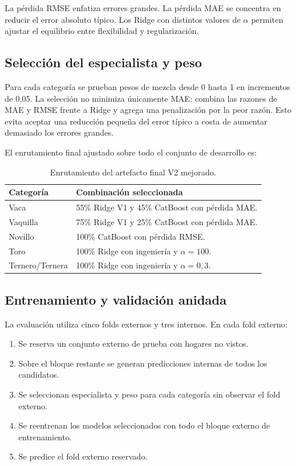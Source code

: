 \documentclass[11pt,a4paper]{article}
\begin{document}
La pérdida RMSE enfatiza errores grandes. La pérdida MAE se concentra en reducir el error absoluto típico. Los Ridge con distintos valores de $\alpha$ permiten ajustar el equilibrio entre flexibilidad y regularización.

\subsection{Selección del especialista y peso}

Para cada categoría se prueban pesos de mezcla desde 0 hasta 1 en incrementos de 0,05. La selección no minimiza únicamente MAE: combina las razones de MAE y RMSE frente a Ridge y agrega una penalización por la peor razón. Esto evita aceptar una reducción pequeña del error típico a costa de aumentar demasiado los errores grandes.

El enrutamiento final ajustado sobre todo el conjunto de desarrollo es:
\begin{table}[H]
\centering
\caption{Enrutamiento del artefacto final V2 mejorado.}
\begin{tabularx}{\textwidth}{p{3.2cm}X}
\toprule
\textbf{Categoría} & \textbf{Combinación seleccionada}\\
\midrule
Vaca & 55\% Ridge V1 y 45\% CatBoost con pérdida MAE.\\
Vaquilla & 75\% Ridge V1 y 25\% CatBoost con pérdida MAE.\\
Novillo & 100\% CatBoost con pérdida RMSE.\\
Toro & 100\% Ridge con ingeniería y $\alpha=100$.\\
Ternero/Ternera & 100\% Ridge con ingeniería y $\alpha=0,3$.\\
\bottomrule
\end{tabularx}
\end{table}

\subsection{Entrenamiento y validación anidada}

La evaluación utiliza cinco folds externos y tres internos. En cada fold externo:
\begin{enumerate}
  \item Se reserva un conjunto externo de prueba con hogares no vistos.
  \item Sobre el bloque restante se generan predicciones internas de todos los candidatos.
  \item Se seleccionan especialista y peso para cada categoría sin observar el fold externo.
  \item Se reentrenan los modelos seleccionados con todo el bloque externo de entrenamiento.
  \item Se predice el fold externo reservado.
\end{enumerate}
\end{document}
